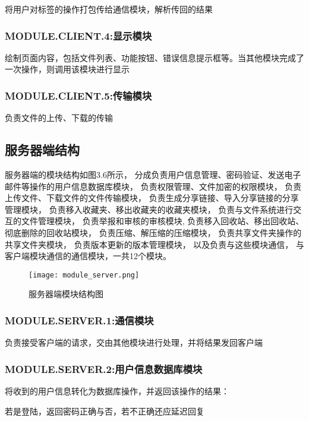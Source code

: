 将用户对标签的操作打包传给通信模块，解析传回的结果

\subsubsection{MODULE.CLIENT.4:显示模块}
绘制页面内容，包括文件列表、功能按钮、错误信息提示框等。当其他模块完成了一次操作，则调用该模块进行显示

\subsubsection{MODULE.CLIENT.5:传输模块}
负责文件的上传、下载的传输





\subsection{服务器端结构}
服务器端的模块结构如图3.6所示，
分成负责用户信息管理、密码验证、发送电子邮件等操作的用户信息数据库模块，
负责权限管理、文件加密的权限模块，
负责上传文件、下载文件的文件传输模块，
负责生成分享链接、导入分享链接的分享管理模块，
负责移入收藏夹、移出收藏夹的收藏夹模块，
负责与文件系统进行交互的文件管理模块，%
负责举报和审核的审核模块,
负责移入回收站、移出回收站、彻底删除的回收站模块，
负责压缩、解压缩的压缩模块，
负责共享文件夹操作的共享文件夹模块，
负责版本更新的版本管理模块，
以及负责与这些模块通信，
与客户端模块通信的通信模块，一共12个模块。

\begin{figure}[!h] 
\centering   
\texttt{[image: module\_server.png]}
\caption{服务器端模块结构图}\label{fig:noted-figure}
\end{figure}

\subsubsection{MODULE.SERVER.1:通信模块}
负责接受客户端的请求，交由其他模块进行处理，并将结果发回客户端

\subsubsection{MODULE.SERVER.2:用户信息数据库模块}
将收到的用户信息转化为数据库操作，并返回该操作的结果：

若是登陆，返回密码正确与否，若不正确还应延迟回复

